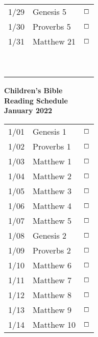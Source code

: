 \documentclass[10pt,landscape,letterpaper]{article}
\begin{document}
\begin{multicols}{5}
\begin{tabular}{p{0.3in}p{0.75in}p{0.4in}}
1/29 & \textcolor[rgb]{0.98,0.00,0.00}{Genesis 5} & \textcolor[rgb]{0.98,0.00,0.00}{$\boxempty$} \\
1/30 & \textcolor[rgb]{0.98,0.00,0.00}{Proverbs 5} & \textcolor[rgb]{0.98,0.00,0.00}{$\boxempty$} \\
1/31 & Matthew 21 & $\boxempty$ \\
 &  &  \\
 &  &  \\
 &  &  \\
 &  &  \\
 &  &  \\
 &  &  \\
 &  &  \\
 &  &  \\
 &  &  \\

\end{tabular}

\begin{center}
\textbf{Children's Bible\\
Reading Schedule\\January 2022}
\end{center}

\begin{tabular}{p{0.3in}p{0.75in}p{0.4in}}
1/01 & \textcolor[rgb]{0.98,0.00,0.00}{Genesis 1} & \textcolor[rgb]{0.98,0.00,0.00}{$\boxempty$} \\
1/02 & \textcolor[rgb]{0.98,0.00,0.00}{Proverbs 1} & \textcolor[rgb]{0.98,0.00,0.00}{$\boxempty$} \\
1/03 & Matthew 1 & $\boxempty$ \\
1/04 & Matthew 2 & $\boxempty$ \\
1/05 & Matthew 3 & $\boxempty$ \\
1/06 & Matthew 4 & $\boxempty$ \\
1/07 & Matthew 5 & $\boxempty$ \\

1/08 & \textcolor[rgb]{0.98,0.00,0.00}{Genesis 2} & \textcolor[rgb]{0.98,0.00,0.00}{$\boxempty$} \\
1/09 & \textcolor[rgb]{0.98,0.00,0.00}{Proverbs 2} & \textcolor[rgb]{0.98,0.00,0.00}{$\boxempty$} \\
1/10 & Matthew 6 & $\boxempty$ \\
1/11 & Matthew 7 & $\boxempty$ \\
1/12 & Matthew 8 & $\boxempty$ \\
1/13 & Matthew 9 & $\boxempty$ \\
1/14 & Matthew 10 & $\boxempty$ \\


\end{tabular}
\end{multicols}
\end{document}
